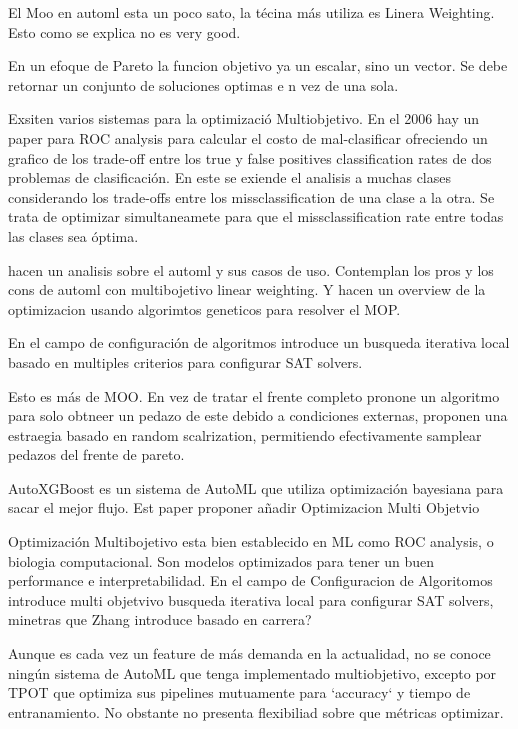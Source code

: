 

El Moo en automl esta un poco sato, la t\'ecina m\'as utiliza es Linera Weighting. Esto como se explica no es very good.

En un efoque de Pareto la funcion objetivo ya un escalar, sino un vector. Se debe retornar un conjunto de soluciones optimas e n vez de una sola.

Exsiten varios sistemas para la optimizaci\'o Multiobjetivo. En el 2006 hay un paper para ROC analysis \cite{everson2006multi} para calcular el costo de mal-clasificar ofreciendo un grafico de los trade-off entre los true y false positives classification rates de dos problemas de clasificaci\'on. En este se exiende el analisis a muchas clases considerando los trade-offs entre los missclassification de una clase a la otra. Se trata de optimizar simultaneamete para que el missclassification rate entre todas las clases sea \'optima.

\cite{jin2008pareto} hacen un analisis sobre el automl y sus casos de uso. Contemplan los pros y los cons de automl con multibojetivo linear weighting. Y hacen un overview de la optimizacion usando algorimtos geneticos para resolver el MOP.


En el campo de configuraci\'on de algoritmos \cite{blot2016mo} introduce un busqueda iterativa local basado en multiples criterios para configurar SAT solvers.

\cite{paria2020flexible} Esto es m\'as de MOO. En vez de tratar el frente completo pronone un algoritmo para solo obtneer un pedazo de este debido a condiciones externas, proponen una estraegia basado en random scalrization, permitiendo efectivamente samplear pedazos del frente de pareto.

AutoXGBoost es un sistema de AutoML que utiliza optimizaci\'on bayesiana para sacar el mejor flujo. Est paper proponer a\~nadir Optimizacion Multi Objetvio 

Optimizaci\'on Multibojetivo esta bien establecido en ML como ROC analysis, o biologia computacional. Son modelos optimizados para tener un buen performance e interpretabilidad.
En el campo de Configuracion de Algoritomos introduce multi objetvivo busqueda iterativa local para configurar SAT solvers, minetras que Zhang introduce basado en carrera?

Aunque es cada vez un feature de m\'as demanda en la actualidad, no se conoce ning\'un sistema de AutoML que tenga implementado multiobjetivo, excepto por TPOT que optimiza sus pipelines mutuamente para `accuracy` y tiempo de entranamiento. No obstante no presenta flexibiliad sobre que m\'etricas optimizar.



